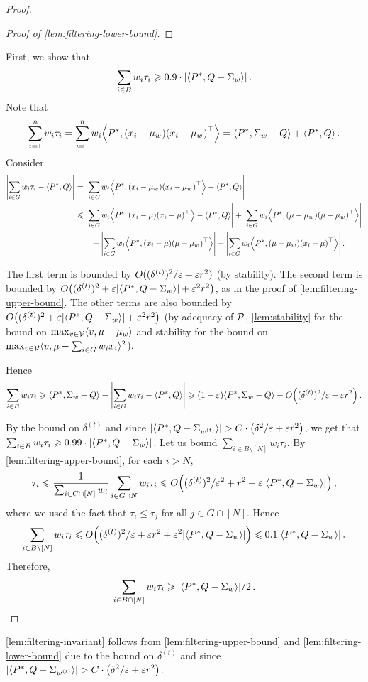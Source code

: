 \begin{proof}
\begin{proof}[Proof of \cref{lem:filtering-lower-bound}]
    
\end{proof}
First, we show that 
\[
\sum_{i\in B} w_i \tau_i \ge 0.9\cdot {\Abs{\Iprod{P^*, Q-\Sigma_{w}}}}\,.
\]
Note that
\[
\sum_{i=1}^n w_i\tau_i = \sum_{i=1}^n w_i \Iprod{P^*, \Paren{x_i-\mu_{w^{}}}\Paren{x_i-\mu_{w^{}}}^\top } = \Iprod{P^*, \Sigma_w - Q} + \Iprod{P^*, Q}\,.
\]
Consider
\begin{align*}
\Abs{\sum_{i\in G} w_i\tau_i - \Iprod{P^*, Q}} 
&=  \Abs{\sum_{i\in G} w_i \Iprod{P^*, \Paren{x_i-\mu_{w^{}}}\Paren{x_i-\mu_{w^{}}}^\top } -  \Iprod{P^*, Q}}
\\&\le \Abs{\sum_{i\in G} w_i \Iprod{P^*, \Paren{x_i-\mu}\Paren{x_i-\mu}^\top } -  \Iprod{P^*, Q}} + 
\Abs{\sum_{i\in G} w_i {\Iprod{P^*, \Paren{\mu-\mu_{w^{}}}\Paren{\mu-\mu_{w^{}}}^\top }}}
\\& \qquad + \Abs{\sum_{i\in G} w_i {\Iprod{P^*, \Paren{x_i-\mu}\Paren{\mu-\mu_{w^{}}}^\top }}}
+\Abs{\sum_{i\in G} w_i {\Iprod{P^*, \Paren{\mu-\mu_{w^{}}}\Paren{x_i-\mu}^\top }}}\,.
\end{align*}

The first term is bounded by $O((\delta^{(t)})^2/\varepsilon + \varepsilon r^2)$ (by stability). The second term is bounded by $O\Paren{\paren{\delta^{(t)}}^2 + \e \Abs{\Iprod{P^*, Q-\Sigma_{w}}} + \e^2 r^2}$, as in the proof of \cref{lem:filtering-upper-bound}. The other terms are also bounded by $O\Paren{\paren{\delta^{(t)}}^2 + \e \Abs{\Iprod{P^*, Q-\Sigma_{w}}} + \e^2 r^2}$ (by adequacy of $\mathcal P$, \cref{lem:stability} for the bound on $\max_{v\in \mathcal V}\langle v, \mu - \mu_w\rangle$ and stability for the bound on $\max_{v\in \mathcal V}\langle v, \mu - \sum_{i\in G} w_ix_i\rangle^2$).

Hence
\[
\sum_{i\in B} w_i \tau_i \ge \Iprod{P^*, \Sigma_w - Q} - \Abs{\sum_{i\in G} w_i\tau_i - \Iprod{P^*, Q}} \ge \Paren{1-\e}\Iprod{P^*, \Sigma_w - Q} - O\Paren{\paren{\delta^{(t)}}^2/\e + \e r^2}\,.
\]

By the bound on $\delta^{(t)}$ and since $\Abs{\iprod{P^*, Q-\Sigma_{w^{(t)}}}} > C\cdot \Paren{\delta^2/\e + \e r^2}$, we get that $\sum_{i\in B} w_i \tau_i \ge 0.99\cdot {\Abs{\Iprod{P^*, Q-\Sigma_{w}}}}$. Let us bound $\sum_{i\in B\setminus[N]} w_i \tau_i$. By \cref{lem:filtering-upper-bound}, for each $i > N$,
\[
\tau_i \le \frac{1}{\sum_{i\in G\cap [N]}w_i} \sum_{i\in G\cap N} w_i \tau_i \le O\Paren{\paren{\delta^{(t)}}^2/\e^2 + r^2  + \e \Abs{\Iprod{P^*, Q-\Sigma_{w}}} }\,,
\]
where we used the fact that $\tau_i \le \tau_j$ for all $j\in G\cap[N]$. Hence
\[
\sum_{i\in B\setminus[N]} w_i \tau_i \le O\Paren{\paren{\delta^{(t)}}^2/\e + \e r^2  + \e^2 \Abs{\Iprod{P^*, Q-\Sigma_{w}}} }\le  0.1 \Abs{\Iprod{P^*, Q-\Sigma_{w}}}\,.
\]
Therefore,
\[
\sum_{i\in B\cap [N]} w_i \tau_i \ge \Abs{\Iprod{P^*, Q-\Sigma_{w}}} / 2\,.
\]
\end{proof}
\cref{lem:filtering-invariant} follows from \cref{lem:filtering-upper-bound} and \cref{lem:filtering-lower-bound} due to the bound on $\delta^{(t)}$ and since $\Abs{\iprod{P^*, Q-\Sigma_{w^{(t)}}}} > C\cdot \Paren{\delta^2/\e + \e r^2}$.
